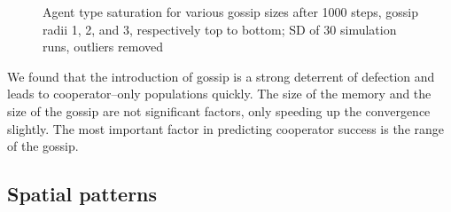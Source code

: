 \documentclass[runningheads]{llncs}
\begin{document}
\begin{figure}[!h]
  \centering
  \caption{Agent type saturation for various gossip sizes after 1000 steps, gossip radii 1, 2, and 3, respectively top to bottom; SD of 30 simulation runs, outliers removed}
  \label{fig:agent_sat/gossip_size_step1000}
\end{figure}

We found that the introduction of gossip is a strong deterrent of defection and leads to cooperator--only populations quickly.
The size of the memory and the size of the gossip are not significant factors, only speeding up the convergence slightly.
The most important factor in predicting cooperator success is the range of the gossip.

\subsection{Spatial patterns}
\end{document}
